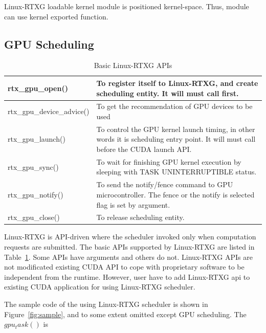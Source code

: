 Linux-RTXG loadable kernel module is positioned kernel-space.
Thus, module can use kernel exported function.

\subsection{GPU Scheduling}
\begin{table}[t]
\begin{center}
\caption{Basic Linux-RTXG APIs}
\label{tab:rtx-api}
\begin{tabular}{|l|p{50em}|} \hline
rtx\_gpu\_open() & To register itself to Linux-RTXG, and create scheduling entity. It will must call first. \\ \hline
rtx\_gpu\_device\_advice() & To get the recommendation of GPU devices to be used \\ \hline
rtx\_gpu\_launch() & To control the GPU kernel launch timing, in other words it is scheduling entry point. It will must call before the CUDA launch API. \\ \hline
rtx\_gpu\_sync() & To wait for finishing GPU kernel execution by sleeping with TASK UNINTERRUPTIBLE status.\\ \hline
rtx\_gpu\_notify() & To send the notify/fence command to GPU microcontroller. The fence or the notify is selected flag is set by argument.\\ \hline
rtx\_gpu\_close() & To release scheduling entity.\\ \hline
\end{tabular}
\end{center}
\end{table}

Linux-RTXG is API-driven where the scheduler invoked only when computation requests are submitted.
The basic APIs supported by Linux-RTXG are listed in Table~\ref{tab:rtx-api}.
Some APIs have arguments and others do not.
Linux-RTXG APIs are not modificated existing CUDA API to cope with proprietary software to be independent from the runtime.
However, user have to add Linux-RTXG api to existing CUDA application for using Linux-RTXG scheduler.

The sample code of the using Linux-RTXG scheduler is shown in Figure~\ref{fig:sample},
and to some extent omitted except GPU scheduling.
The $gpu_task()$ is

